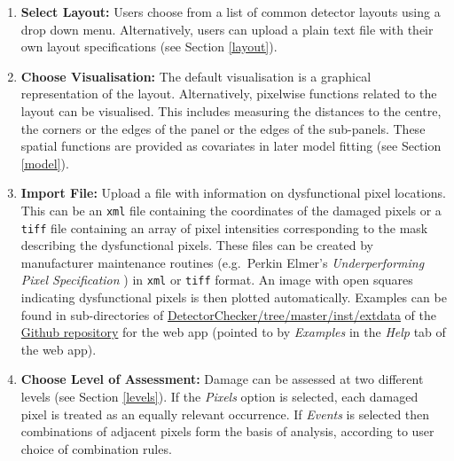 \documentclass[11pt,a4paper]{article}
\begin{document}
\begin{mdframed}

\medskip

\begin{enumerate}

\item {\bf Select Layout:} 
Users choose from a list of common detector layouts using a drop down menu. Alternatively, users can upload a plain text file with their own layout specifications (see Section \ref{layout}). 

\item {\bf Choose Visualisation:} 
The default visualisation is a graphical representation of the layout.
Alternatively, pixelwise functions related to the layout can be visualised. This includes 
measuring the distances to the centre, the corners or the edges of the panel or the edges 
of the sub-panels. 
These spatial functions are provided as covariates in later model fitting (see Section \ref{model}).

\item {\bf Import File:} 
Upload a file with information on dysfunctional pixel locations.
This can be an \texttt{xml} file containing the coordinates of the damaged pixels or a \texttt{tiff} file containing an array of pixel intensities corresponding to the mask 
describing the dysfunctional pixels. 
These files can be created by manufacturer maintenance routines (e.g.~Perkin Elmer's \emph{Underperforming Pixel Specification}
\cite[Section 5.2]{manualXRD1621}) in \texttt{xml} or \texttt{tiff} format. An image with open squares indicating dysfunctional pixels
is then plotted automatically.
Examples can be found in sub-directories of
\href{https://github.com/alan-turing-institute/DetectorChecker/tree/master/inst/extdata}{DetectorChecker/tree/master/inst/extdata} 
of the
\href{https://doi.org/10.5281/zenodo.3662235}{Github repository}
for the web app
(pointed to by \emph{Examples} in the \emph{Help} tab of the web app).


\item {\bf Choose Level of Assessment:} 
Damage can be assessed at two different levels (see Section \ref{levels}). If the \emph{Pixels} option is selected, each damaged pixel is treated as an equally relevant occurrence. If \emph{Events} is selected then combinations of adjacent pixels form the basis of analysis, according to user choice of combination rules. 


\end{enumerate}
\end{mdframed}
\end{document}
